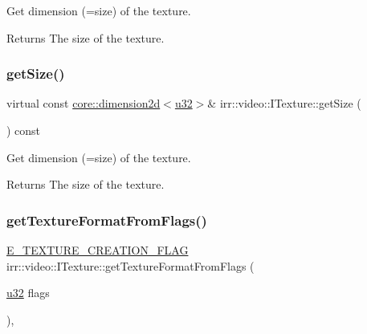 Get dimension (=size) of the texture. 

\begin{DoxyReturn}{Returns}
The size of the texture. 
\end{DoxyReturn}
\mbox{\label{classirr_1_1video_1_1ITexture_adfcf9558c0f1ae543782c03f7903c48e}} 
\subsubsection{\texorpdfstring{get\+Size()}{getSize()}\hspace{0.1cm}{\footnotesize\ttfamily [2/2]}}
{\footnotesize\ttfamily virtual const \hyperlink{classirr_1_1core_1_1dimension2d}{core\+::dimension2d}$<$\hyperlink{namespaceirr_a0416a53257075833e7002efd0a18e804}{u32}$>$\& irr\+::video\+::\+I\+Texture\+::get\+Size (\begin{DoxyParamCaption}{ }\end{DoxyParamCaption}) const\hspace{0.3cm}{\ttfamily [pure virtual]}}



Get dimension (=size) of the texture. 

\begin{DoxyReturn}{Returns}
The size of the texture. 
\end{DoxyReturn}
\mbox{\label{classirr_1_1video_1_1ITexture_afff3160f6aa5f749365ae4f776a440f3}} 
\subsubsection{\texorpdfstring{get\+Texture\+Format\+From\+Flags()}{getTextureFormatFromFlags()}\hspace{0.1cm}{\footnotesize\ttfamily [1/2]}}
{\footnotesize\ttfamily \hyperlink{namespaceirr_1_1video_acaf6f7414534f7d62bff18c5bf11876f}{E\+\_\+\+T\+E\+X\+T\+U\+R\+E\+\_\+\+C\+R\+E\+A\+T\+I\+O\+N\+\_\+\+F\+L\+AG} irr\+::video\+::\+I\+Texture\+::get\+Texture\+Format\+From\+Flags (\begin{DoxyParamCaption}\item[{\hyperlink{namespaceirr_a0416a53257075833e7002efd0a18e804}{u32}}]{flags }\end{DoxyParamCaption})\hspace{0.3cm}{\ttfamily [inline]}, {\ttfamily [protected]}}



